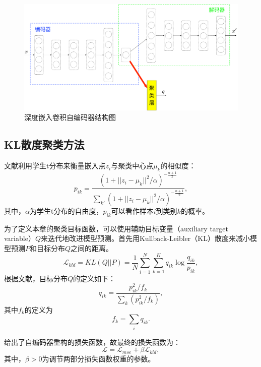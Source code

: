 \begin{figure}[hbt]
	\centering
	\includegraphics[width=13.5cm]{figures/AE/decc}
	\caption{深度嵌入卷积自编码器结构图}
	\label{fig:decc}
\end{figure}

\subsection{KL散度聚类方法}
文献\cite{maaten2008visualizing}利用学生t分布来衡量嵌入点$z_i$与聚类中心点$\mu_k$的相似度：
\begin{equation}
p_{ik}=\frac{(1+||z_i-\mu_k||^2/\alpha)^{-\frac{\alpha+1}{2}}}{\sum_{k'}(1+||z_i-\mu_k||^2/\alpha)^{-\frac{\alpha+1}{2}}},
	\label{equ:p}
\end{equation}
其中，$\alpha$为学生t分布的自由度，$p_{ik}$可以看作样本$i$到类别$k$的概率。

为了定义本章的聚类目标函数，可以使用辅助目标变量（auxiliary target variable）$Q$来迭代地改进模型预测。首先用Kullback-Leibler（KL）散度来减小模型预测$P$和目标分布$Q$之间的距离。
\begin{equation}
	\mathscr{L}_{kld}=KL(Q||P)=\frac{1}{N}\sum_{i=1}^{N}\sum_{k=1}^{K}q_{ik}\log{\frac{q_{ik}}{p_{ik}}},
	\label{equ:kldfirst}
\end{equation}
根据文献\cite{xie2016unsupervised}，目标分布$Q$的定义如下：
\begin{equation}
	q_{ik}=\frac{p_{ik}^2/f_k}{\sum_k(p_{ik}^2/f_k)},
	\label{equ:traget_distribution}
\end{equation}
其中$f_k$的定义为
\begin{equation}
	f_k=\sum_iq_{ik}.
\end{equation}

给出了自编码器重构的损失函数，故最终的损失函数为：
\begin{equation}
	\mathscr{L}=\mathscr{L}_{mse}+\beta \mathscr{L}_{kld},
	\label{equ:l_last}
\end{equation}
其中，$\beta > 0$为调节两部分损失函数权重的参数。

